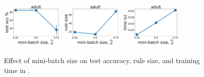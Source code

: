 \begin{figure}
	\subfloat
	{\includegraphics[width=0.27\textwidth]{figures/interpretability/relaxed-cnf/adult_test_accuracy_vary_subsamplesize.pdf}}
	\subfloat
	{\includegraphics[width=0.27\textwidth]{figures/interpretability/relaxed-cnf/adult_rule_size_vary_subsamplesize.pdf}}
	\subfloat
	{\includegraphics[width=0.27\textwidth]{figures/interpretability/relaxed-cnf/adult_time_vary_subsamplesize.pdf}} 
	\\
	
	
	\caption[Effect of mini-batch size in {\crr}]{Effect of mini-batch size on test accuracy, rule size, and training time in {\crr}. } 
	\label{interpretability_crr_fig:result_minibatch}
\end{figure}




